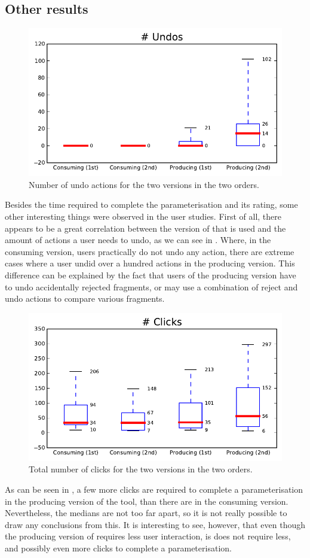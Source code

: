 \subsection{Other results}

\begin{figure}
\center
\includegraphics[width=.6\textwidth]{img/graphs/1a_10.pdf}
\caption{Number of undo actions for the two versions in the two orders.}
\end{figure}

Besides the time required to complete the parameterisation and its rating, some other interesting things were observed in the user studies. First of all, there appears to be a great correlation between the version of \oframp{} that is used and the amount of actions a user needs to undo, as we can see in . Where, in the consuming version, users practically do not undo any action, there are extreme cases where a user undid over a hundred actions in the producing version. This difference can be explained by the fact that users of the producing version have to undo accidentally rejected fragments, or may use a combination of reject and undo actions to compare various fragments.

\begin{figure}
\center
\includegraphics[width=.6\textwidth]{img/graphs/1a_04.pdf}
\caption{Total number of clicks for the two versions in the two orders.}
\end{figure}

As can be seen in , a few more clicks are required to complete a parameterisation in the producing version of the tool, than there are in the consuming version. Nevertheless, the medians are not too far apart, so it is not really possible to draw any conclusions from this. It is interesting to see, however, that even though the producing version of \oframp{} requires less user interaction, is does not require less, and possibly even more clicks to complete a parameterisation.


